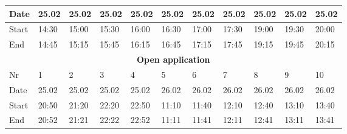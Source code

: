 \begin{table}[H]
\begin{tabular}{|lllllllllll|}
\multicolumn{1}{|l|}{Date}   & \multicolumn{1}{l|}{25.02} & \multicolumn{1}{l|}{25.02} & \multicolumn{1}{l|}{25.02} & \multicolumn{1}{l|}{25.02} & \multicolumn{1}{l|}{25.02} & \multicolumn{1}{l|}{25.02} & \multicolumn{1}{l|}{25.02} & \multicolumn{1}{l|}{25.02} & \multicolumn{1}{l|}{25.02} & 25.02 \\ \hline
\multicolumn{1}{|l|}{Start}  & \multicolumn{1}{l|}{14:30} & \multicolumn{1}{l|}{15:00} & \multicolumn{1}{l|}{15:30} & \multicolumn{1}{l|}{16:00} & \multicolumn{1}{l|}{16:30} & \multicolumn{1}{l|}{17:00} & \multicolumn{1}{l|}{17:30} & \multicolumn{1}{l|}{19:00} & \multicolumn{1}{l|}{19:30} & 20:00 \\ \hline
\multicolumn{1}{|l|}{End}    & \multicolumn{1}{l|}{14:45} & \multicolumn{1}{l|}{15:15} & \multicolumn{1}{l|}{15:45} & \multicolumn{1}{l|}{16:15} & \multicolumn{1}{l|}{16:45} & \multicolumn{1}{l|}{17:15} & \multicolumn{1}{l|}{17:45} & \multicolumn{1}{l|}{19:15} & \multicolumn{1}{l|}{19:45} & 20:15 \\ \hline
\multicolumn{11}{|c|}{\textbf{Open application}}                                                                                                                                                                                                                                                          \\ \hline
\multicolumn{1}{|l|}{Nr} & \multicolumn{1}{l|}{1}     & \multicolumn{1}{l|}{2}     & \multicolumn{1}{l|}{3}     & \multicolumn{1}{l|}{4}     & \multicolumn{1}{l|}{5}     & \multicolumn{1}{l|}{6}     & \multicolumn{1}{l|}{7}     & \multicolumn{1}{l|}{8}     & \multicolumn{1}{l|}{9}     & 10    \\ \hline
\multicolumn{1}{|l|}{Date}   & \multicolumn{1}{l|}{25.02} & \multicolumn{1}{l|}{25.02} & \multicolumn{1}{l|}{25.02} & \multicolumn{1}{l|}{25.02} & \multicolumn{1}{l|}{26.02} & \multicolumn{1}{l|}{26.02} & \multicolumn{1}{l|}{26.02} & \multicolumn{1}{l|}{26.02} & \multicolumn{1}{l|}{26.02} & 26.02 \\ \hline
\multicolumn{1}{|l|}{Start}  & \multicolumn{1}{l|}{20:50} & \multicolumn{1}{l|}{21:20} & \multicolumn{1}{l|}{22:20} & \multicolumn{1}{l|}{22:50} & \multicolumn{1}{l|}{11:10} & \multicolumn{1}{l|}{11:40} & \multicolumn{1}{l|}{12:10} & \multicolumn{1}{l|}{12:40} & \multicolumn{1}{l|}{13:10} & 13:40 \\ \hline
\multicolumn{1}{|l|}{End}    & \multicolumn{1}{l|}{20:52} & \multicolumn{1}{l|}{21:21} & \multicolumn{1}{l|}{22:22} & \multicolumn{1}{l|}{22:52} & \multicolumn{1}{l|}{11:11} & \multicolumn{1}{l|}{11:41} & \multicolumn{1}{l|}{12:11} & \multicolumn{1}{l|}{12:41} & \multicolumn{1}{l|}{13:11} & 13:41 \\ \hline

\end{tabular}
\end{table}
